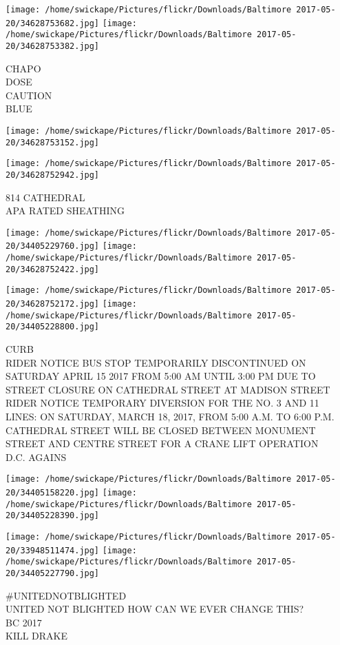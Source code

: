 \documentclass[10pt,letterpaper]{article}
\begin{document}
\texttt{[image: /home/swickape/Pictures/flickr/Downloads/Baltimore 2017-05-20/34628753682.jpg]}
\texttt{[image: /home/swickape/Pictures/flickr/Downloads/Baltimore 2017-05-20/34628753382.jpg]}

CHAPO\\
DOSE\\
CAUTION\\
BLUE
\pagebreak

\texttt{[image: /home/swickape/Pictures/flickr/Downloads/Baltimore 2017-05-20/34628753152.jpg]}

\vspace{0.25in}
\texttt{[image: /home/swickape/Pictures/flickr/Downloads/Baltimore 2017-05-20/34628752942.jpg]}

814 CATHEDRAL\\
APA RATED SHEATHING
\pagebreak

\texttt{[image: /home/swickape/Pictures/flickr/Downloads/Baltimore 2017-05-20/34405229760.jpg]}
\texttt{[image: /home/swickape/Pictures/flickr/Downloads/Baltimore 2017-05-20/34628752422.jpg]}

\texttt{[image: /home/swickape/Pictures/flickr/Downloads/Baltimore 2017-05-20/34628752172.jpg]}
\texttt{[image: /home/swickape/Pictures/flickr/Downloads/Baltimore 2017-05-20/34405228800.jpg]}

CURB\\
RIDER NOTICE BUS STOP TEMPORARILY DISCONTINUED ON SATURDAY APRIL 15 2017 FROM 5:00 AM UNTIL 3:00 PM DUE TO STREET CLOSURE ON CATHEDRAL STREET AT MADISON STREET\\
RIDER NOTICE TEMPORARY DIVERSION FOR THE NO. 3 AND 11 LINES: ON SATURDAY, MARCH 18, 2017, FROM 5:00 A.M. TO 6:00 P.M. CATHEDRAL STREET WILL BE CLOSED BETWEEN MONUMENT STREET AND CENTRE STREET FOR A CRANE LIFT OPERATION\\
D.C. AGAINS
\pagebreak

\texttt{[image: /home/swickape/Pictures/flickr/Downloads/Baltimore 2017-05-20/34405158220.jpg]}
\texttt{[image: /home/swickape/Pictures/flickr/Downloads/Baltimore 2017-05-20/34405228390.jpg]}

\texttt{[image: /home/swickape/Pictures/flickr/Downloads/Baltimore 2017-05-20/33948511474.jpg]}
\texttt{[image: /home/swickape/Pictures/flickr/Downloads/Baltimore 2017-05-20/34405227790.jpg]}

\#UNITEDNOTBLIGHTED\\
UNITED NOT BLIGHTED HOW CAN WE EVER CHANGE THIS?\\
BC 2017\\
KILL DRAKE
\pagebreak
\end{document}
